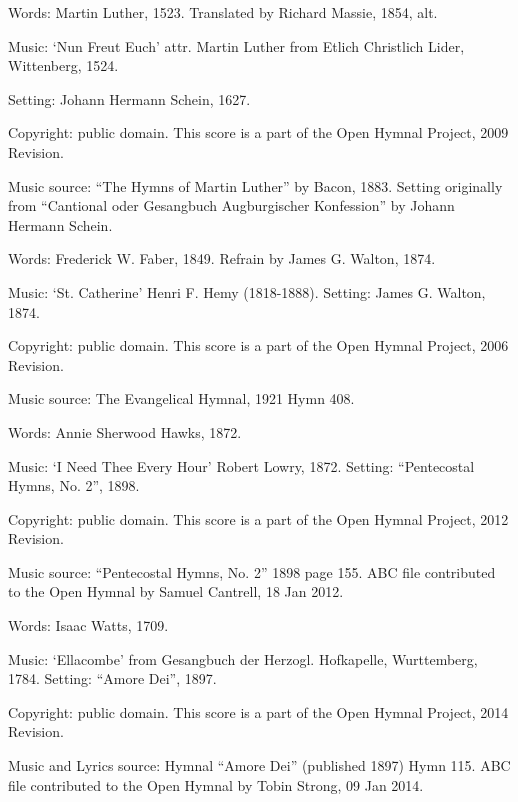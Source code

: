 \begin{multicols}{2}
\par\noindent
Words: Martin Luther, 1523.  Translated by Richard Massie, 1854, alt. 
\par\noindent
Music: `Nun Freut Euch' attr. Martin Luther from Etlich Christlich Lider, Wittenberg, 1524. 
\par\noindent
Setting: Johann Hermann Schein, 1627.
\par\noindent
Copyright: public domain. This score is a part of the Open Hymnal Project, 2009 Revision.
\par\noindent
Music source: ``The Hymns of Martin Luther'' by Bacon, 1883.  Setting originally from ``Cantional oder Gesangbuch Augburgischer Konfession'' by Johann Hermann Schein.

\par\noindent
Words: Frederick W. Faber, 1849. Refrain by James G. Walton, 1874. 
\par\noindent
Music: `St. Catherine' Henri F. Hemy (1818-1888).  Setting: James G. Walton, 1874.
\par\noindent
Copyright: public domain. This score is a part of the Open Hymnal Project, 2006 Revision.
\par\noindent
Music source: The Evangelical Hymnal, 1921  Hymn 408.

\par\noindent
Words: Annie Sherwood Hawks, 1872.
\par\noindent
Music: `I Need Thee Every Hour' Robert Lowry, 1872.  Setting: ``Pentecostal Hymns, No. 2'', 1898.
\par\noindent
Copyright: public domain. This score is a part of the Open Hymnal Project, 2012 Revision.
\par\noindent
Music source: ``Pentecostal Hymns, No. 2'' 1898 page 155.   ABC file contributed to the Open Hymnal by Samuel Cantrell, 18 Jan 2012.

\par\noindent
Words: Isaac Watts, 1709.
\par\noindent
Music: `Ellacombe' from Gesangbuch der Herzogl. Hofkapelle, Wurttemberg, 1784. Setting: ``Amore Dei'', 1897.
\par\noindent
Copyright: public domain. This score is a part of the Open Hymnal Project, 2014 Revision.
\par\noindent
Music and Lyrics source: Hymnal ``Amore Dei'' (published 1897)  Hymn 115.  ABC file contributed to the Open Hymnal by Tobin Strong, 09 Jan 2014.


\end{multicols}
